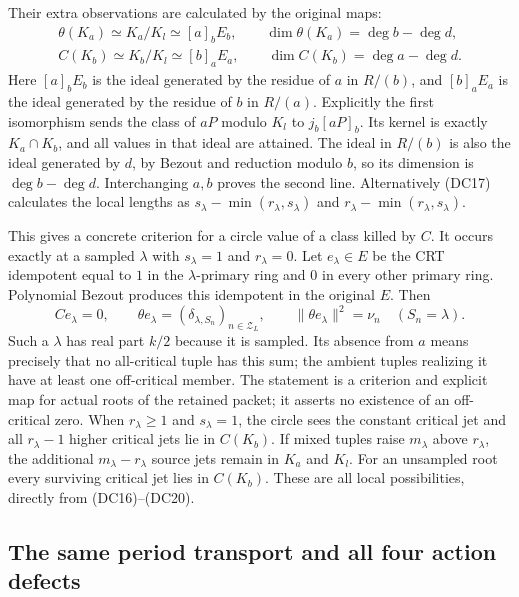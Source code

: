 Their extra observations are calculated by the original maps:
\[
 \begin{gathered}
 \theta(K_a)\simeq K_a/K_l\simeq [a]_b E_b,\qquad
 \dim\theta(K_a)=\deg b-\deg d,\\
 C(K_b)\simeq K_b/K_l\simeq [b]_a E_a,\qquad
 \dim C(K_b)=\deg a-\deg d .
 \end{gathered}
 \tag{DC20}
\]
Here $[a]_b E_b$ is the ideal generated by the residue of $a$
in $R/(b)$, and $[b]_a E_a$ is the ideal generated by the residue
of $b$ in $R/(a)$.  Explicitly the first
isomorphism sends the class of $aP$ modulo $K_l$ to
$j_b[aP]_b$.  Its kernel is exactly $K_a\cap K_b$, and all
values in that ideal are attained.  The ideal in $R/(b)$ is
also the ideal generated by $d$, by Bezout and reduction modulo
$b$, so its dimension is $\deg b-\deg d$.  Interchanging $a,b$
proves the second line.  Alternatively (DC17) calculates the
local lengths as
$s_\lambda-\min(r_\lambda,s_\lambda)$ and
$r_\lambda-\min(r_\lambda,s_\lambda)$.

This gives a concrete criterion for a circle value of a class killed
by $C$.  It occurs exactly at a sampled $\lambda$ with
$s_\lambda=1$ and $r_\lambda=0$.
Let $e_\lambda\in E$ be the CRT idempotent equal to $1$ in the
$\lambda$-primary ring and $0$ in every other primary ring.
Polynomial Bezout produces this idempotent in the original $E$.
Then
\[
 Ce_\lambda=0,\qquad
 \theta e_\lambda=(\delta_{\lambda,S_n})_{n\in\mathcal Z_L},
 \qquad
 \|\theta e_\lambda\|^2=\nu_n\quad(S_n=\lambda).
 \tag{DC21}
\]
Such a $\lambda$ has real part $k/2$ because it is sampled.
Its absence from $a$ means precisely that no all-critical tuple
has this sum; the ambient tuples realizing it have at least one
off-critical member.  The statement is a criterion and explicit
map for actual roots of the retained packet; it asserts no
existence of an off-critical zero.  When $r_\lambda\ge1$ and
$s_\lambda=1$, the circle sees the constant critical jet and all
$r_\lambda-1$ higher critical jets lie in $C(K_b)$.  If mixed
tuples raise $m_\lambda$ above $r_\lambda$, the additional
$m_\lambda-r_\lambda$ source jets remain in $K_a$ and $K_l$.
For an unsampled root every surviving critical jet lies in
$C(K_b)$.  These are all local possibilities, directly from
(DC16)--(DC20).

\subsection{The same period transport and all four action defects}

